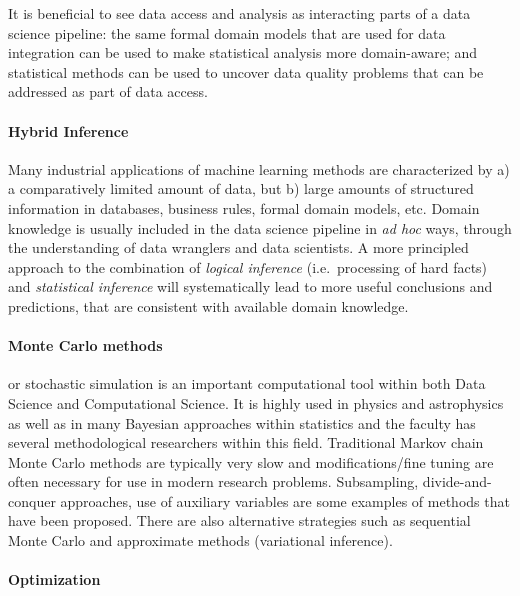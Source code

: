 \documentclass[a4paper,10pt]{article}
\begin{document}
It is beneficial to see data access and analysis as interacting parts of a data science pipeline: the same formal domain models that are used for data integration can be used to make statistical analysis more domain-aware; and statistical methods can be used to uncover data quality problems that can be addressed as part of data access.

\paragraph{Hybrid Inference}

Many industrial applications of machine learning methods are characterized by a) a comparatively limited amount of data, but b) large amounts of structured information in databases, business rules, formal domain models, etc.  Domain knowledge is usually included in the data science pipeline in \emph{ad hoc} ways, through the understanding of data wranglers and data scientists.  A more principled approach to the combination of \emph{logical inference} (i.e.~processing of hard facts) and \emph{statistical inference} will systematically lead to more useful conclusions and predictions, that are consistent with available domain knowledge.


\paragraph{Monte Carlo methods} or stochastic simulation is an important computational tool within both Data Science and Computational Science. It is highly used in physics and astrophysics as well as in many Bayesian approaches within statistics and the faculty has several methodological researchers within this field. Traditional Markov chain Monte Carlo methods are typically very slow and modifications/fine tuning are often necessary for use in modern research problems. Subsampling, divide-and-conquer approaches, use of auxiliary variables 
are some examples of methods that have been proposed. There are also alternative strategies such as sequential Monte Carlo and approximate methods (variational inference).

\paragraph{Optimization}
\end{document}
